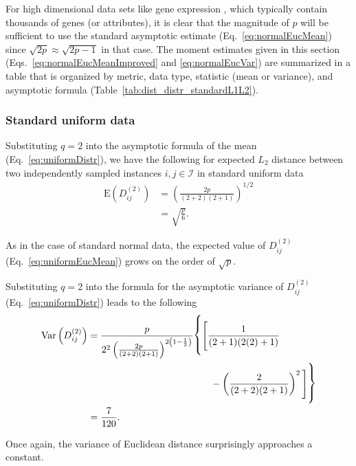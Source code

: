 \documentclass[aos]{imsart}
\begin{document}
For high dimensional data sets like gene expression \cite{brazma2000,wang2018}, which typically contain thousands of genes (or attributes), it is clear that the magnitude of $p$ will be sufficient to use the standard asymptotic estimate (Eq.~\ref{eq:normalEucMean}) since $\sqrt{2p} \approx \sqrt{2p - 1}$ in that case. The moment estimates given in this section (Eqs.~\ref{eq:normalEucMeanImproved} and \ref{eq:normalEucVar}) are summarized in a table that is organized by metric, data type, statistic (mean or variance), and asymptotic formula (Table~\ref{tab:dist_distr_standardL1L2}).

\subsubsection{Standard uniform data}

Substituting $q=2$ into the asymptotic formula of the mean (Eq.~\ref{eq:uniformDistr}), we have the following for expected $L_2$ distance between two independently sampled instances $i,j \in \mathcal{I}$ in standard uniform data
%
\begin{equation}\label{eq:uniformEucMean}
\begin{aligned}
\text{E}\left(D^{(2)}_{ij}\right) &= \left(\frac{2p}{(2+2)(2+1)}\right)^{1/2} \\
&= \sqrt{\frac{p}{6}}.
\end{aligned}
\end{equation}

As in the case of standard normal data, the expected value of $D^{(2)}_{ij}$ (Eq.~\ref{eq:uniformEucMean}) grows on the order of $\sqrt{p}$. 

Substituting $q=2$ into the formula for the asymptotic variance of $D^{(2)}_{ij}$ (Eq.~\ref{eq:uniformDistr}) leads to the following
%
\begin{equation}\label{eq:uniformEucVar}
\begin{aligned}
\text{Var}\left(D^{(2)}_{ij}\right) &= \frac{p}{2^2\left(\frac{2p}{(2 + 2)(2 + 1)}\right)^{2\left(1 - \frac{1}{2}\right)}} {\fontsize{0.5cm}{1pt}\selectfont \Biggl\{}{\Biggl[}\frac{1}{(2 + 1)(2(2) + 1)} \\
&\hspace{4.5cm}- \left(\frac{2}{(2 + 2)(2 + 1)}\right)^2{\Biggr]}{\fontsize{0.5cm}{1pt}\selectfont \Biggr\}} \\
&= \frac{7}{120}.
\end{aligned}
\end{equation}

Once again, the variance of Euclidean distance surprisingly approaches a constant.
\end{document}

